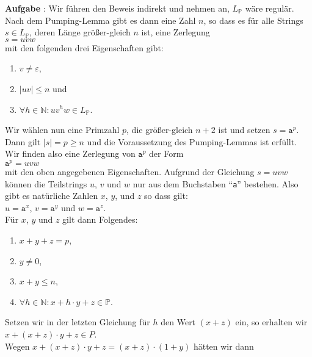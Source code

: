 \documentclass{article}
\newcounter{aufgabe}
\newcommand{\exercise}{\vspace*{0.3cm}
\stepcounter{aufgabe}

\noindent
\textbf{Aufgabe \arabic{aufgabe}}: }
\begin{document}
\exercise
Wir f\"uhren den Beweis indirekt und nehmen an, $L_{\mathbb{P}}$ w\"are regul\"ar.  Nach
dem Pumping-Lemma gibt es dann eine Zahl $n$, so dass es f\"ur alle Strings $s \in L_{\mathbb{P}}$, 
deren L\"ange gr\"o{\ss}er-gleich $n$ ist, eine Zerlegung
\\[0.2cm]
\hspace*{1.3cm}
$s = uvw$
\\[0.2cm]
mit den folgenden drei Eigenschaften gibt:
\begin{enumerate}
\item $v \not= \varepsilon$, 
\item $|uv| \leq n$ \quad und
\item $\forall h \in \mathbb{N}: u v^h w \in L_{\mathbb{P}}$.
\end{enumerate}
Wir w\"ahlen nun eine Primzahl $p$, die gr\"o{\ss}er-gleich  $n + 2$ ist und setzen $s = \mathtt{a}^p$.
Dann gilt $|s| = p \geq n$ und die Voraussetzung des Pumping-Lemmas ist erf\"ullt.
Wir finden also eine Zerlegung von $\mathtt{a}^p$ der Form
\\[0.2cm]
\hspace*{1.3cm}
$\mathtt{a}^p = uvw$ 
\\[0.2cm]
mit den oben angegebenen Eigenschaften.
Aufgrund der Gleichung $s = uvw$ k\"onnen die Teilstrings $u$, $v$ und $w$ nur aus dem
Buchstaben ``\texttt{a}'' bestehen.  Also gibt es nat\"urliche Zahlen $x$, $y$, und
$z$ so dass gilt:
\\[0.2cm]
\hspace*{1.3cm}
$u = \mathtt{a}^x$, \quad $v = \mathtt{a}^y$ \quad und \quad $w = \mathtt{a}^z$.
\\[0.2cm]
F\"ur  $x$, $y$ und $z$ gilt dann Folgendes:
\begin{enumerate}
\item $x + y + z = p$,
\item $y \not= 0$,
\item $x + y \leq n$,
\item $\forall h \in \mathbb{N}: x + h \cdot y + z \in \mathbb{P}$.
\end{enumerate}
Setzen wir in der letzten Gleichung f\"ur $h$ den Wert $(x + z)$ ein, so erhalten wir
\\[0.2cm]
\hspace*{1.3cm}
$x + (x + z)\cdot y + z \in P$.
\\[0.2cm]
Wegen $x + (x + z)\cdot y + z = (x + z) \cdot (1 + y)$ h\"atten wir dann
\\[0.2cm]
\end{document}
